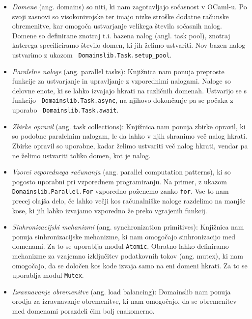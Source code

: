 \documentclass[mat1, tisk]{fmfdelo}
\begin{document}
\begin{itemize} \label{itemize:domainslib}
  \item \emph{Domene} (ang. domains) so niti, ki nam zagotavljajo sočasnost v OCaml-u. 
        Po svoji zasnovi so visokonivojske ter imajo nizke stroške dodatne računske obremenitve, kar
        omogoča ustvarjanje velikega števila sočasnih nalog. Domene so definirane znotraj t.i. bazena nalog
        (angl. task pool), znotraj katerega specificiramo število domen, ki jih želimo ustvariti. Nov bazen
        nalog ustvarimo z ukazom ~\texttt{Domainslib.Task.setup\_pool}.
  \item \emph{Paralelne naloge} (ang. parallel tasks): Knjižnica nam ponuja preproste funkcije za ustvarjanje in upravljanje
        z vzporednimi nalogami. Naloge so delovne enote, ki se lahko izvajajo hkrati na različnih domenah.
        Ustvarijo se s funkcijo ~\texttt{Domainslib.Task.async}, na njihovo dokončanje pa se počaka z uporabo
        ~\texttt{Domainslib.Task.await}.
  \item \emph{Zbirke opravil} (ang. task collections): Knjižnica nam ponuja zbirke opravil, ki so podobne paralelnim nalogam, 
        le da lahko v njih shranimo več nalog hkrati. Zbirke opravil so uporabne, kadar želimo ustvariti več nalog hkrati,
        vendar pa ne želimo ustvariti toliko domen, kot je nalog.
  \item \emph{Vzorci vzporednega računanja} (ang. parallel computation patterns), ki so pogosto uporabni pri vzporednem
        programiranju. Na primer, z ukazom \linebreak \texttt{Domainslib.Parallel.For} vzporedno poženemo zanko \texttt{for}.
        Vse to nam precej olajša delo, če lahko večji kos računalniške naloge razdelimo na manjše kose, ki jih lahko
        izvajamo vzporedno že preko vgrajenih funkcij.
  \item \emph{Sinhronizacijski mehanizmi} (ang. synchronization primitives): Knjižnica nam ponuja sinhronizacijske mehanizme,
        ki nam omogočajo sinhronizacijo med domenami. Za to se uporablja modul \texttt{Atomic}. Obratno lahko definiramo
        mehanizme za vzajemno izključitev podatkovnih tokov (ang. mutex), ki nam omogočajo, da se določen kos kode
        izvaja samo na eni domeni hkrati. Za to se uporablja modul \texttt{Mutex}.
  \item \emph{Izravnavanje obremenitve} (ang. load balancing): Domainslib nam ponuja orodja za izravnavanje obremenitve, 
        ki nam omogočajo, da se obremenitev med domenami porazdeli čim bolj enakomerno.
\end{itemize}
\end{document}
